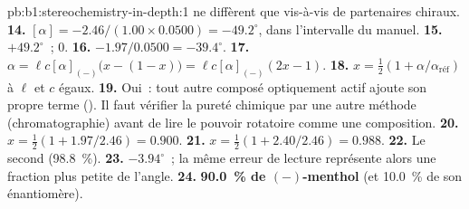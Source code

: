 \begin{solution}{pb:b1:stereochemistry-in-depth:1}
 ne diffèrent que vis-à-vis de partenaires chiraux.
\textbf{14.} $[\alpha] = -2.46/(1.00 \times 0.0500) = -49.2^\circ$, dans
l'intervalle du manuel.
\textbf{15.} $+49.2^\circ$~; $0$.
\textbf{16.} $-1.97/0.0500 = -39.4^\circ$.
\textbf{17.} $\alpha = \ell c[\alpha]_{(-)}\bigl(x - (1 - x)\bigr) =
\ell c[\alpha]_{(-)}(2x - 1)$.
\textbf{18.} $x = \frac12(1 + \alpha/\alpha_{\text{réf}})$ à $\ell$ et $c$
égaux.
\textbf{19.} Oui~: tout autre composé optiquement actif ajoute son propre
terme (). Il faut vérifier la pureté chimique par une autre
méthode (chromatographie) avant de lire le pouvoir rotatoire comme une
composition.
\textbf{20.} $x = \frac12(1 + 1.97/2.46) = 0.900$.
\textbf{21.} $x = \frac12(1 + 2.40/2.46) = 0.988$.
\textbf{22.} Le second (\qty{98.8}{\percent}).
\textbf{23.} $-3.94^\circ$~; la même erreur de lecture représente alors
une fraction plus petite de l'angle.
\textbf{24.} \textbf{\qty{90.0}{\percent} de $(-)$-menthol} (et
\qty{10.0}{\percent} de son énantiomère).
\end{solution}
